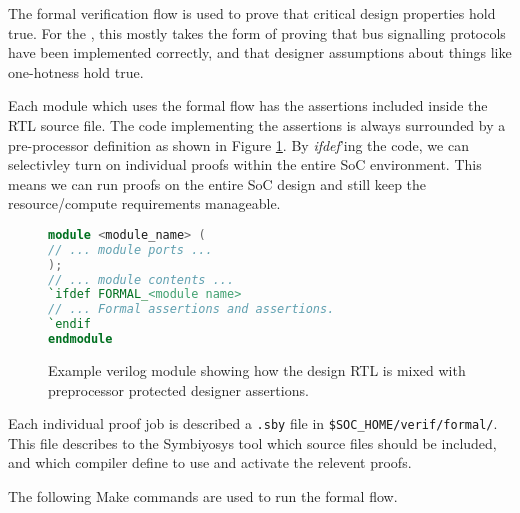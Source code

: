 
The formal verification flow is used to prove that critical design
properties hold true.
For the \SCARVSOC, this mostly takes the form of proving that bus
signalling protocols have been implemented correctly, and that
designer assumptions about things like one-hotness hold true.

Each module which uses the formal flow has the assertions included
inside the RTL source file.
The code implementing the assertions is always surrounded by a
pre-processor definition as shown in Figure \ref{fig:symbiyosys:module}.
By {\em ifdef}'ing the code, we can selectivley turn on individual
proofs within the entire SoC environment.
This means we can run proofs on the entire SoC design and still
keep the resource/compute requirements manageable.

\begin{figure}
\centering
\begin{lstlisting}[style=block, language=verilog]
module <module_name> (
// ... module ports ...
);
// ... module contents ...
`ifdef FORMAL_<module name>
// ... Formal assertions and assertions.
`endif
endmodule
\end{lstlisting}
\caption{Example verilog module showing how the design RTL is mixed
with preprocessor protected designer assertions.}
\label{fig:symbiyosys:module}
\end{figure}

Each individual proof job is described a {\tt .sby} file in
{\tt \$SOC\_HOME/verif/formal/}.
This file describes to the Symbiyosys tool which source files
should be included, and which compiler define to
use and activate the relevent proofs.

The following Make commands are used to run the formal flow.

